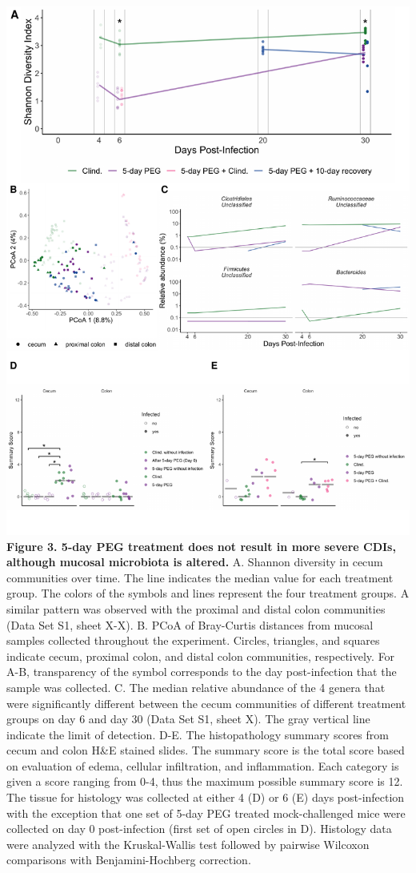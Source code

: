 \documentclass[
  11pt,
]{article}
\begin{document}
\includegraphics{figure_3.pdf} \textbf{Figure 3. 5-day PEG treatment
does not result in more severe CDIs, although mucosal microbiota is
altered.} A. Shannon diversity in cecum communities over time. The line
indicates the median value for each treatment group. The colors of the
symbols and lines represent the four treatment groups. A similar pattern
was observed with the proximal and distal colon communities (Data Set
S1, sheet X-X). B. PCoA of Bray-Curtis distances from mucosal samples
collected throughout the experiment. Circles, triangles, and squares
indicate cecum, proximal colon, and distal colon communities,
respectively. For A-B, transparency of the symbol corresponds to the day
post-infection that the sample was collected. C. The median relative
abundance of the 4 genera that were significantly different between the
cecum communities of different treatment groups on day 6 and day 30
(Data Set S1, sheet X). The gray vertical line indicate the limit of
detection. D-E. The histopathology summary scores from cecum and colon
H\&E stained slides. The summary score is the total score based on
evaluation of edema, cellular infiltration, and inflammation. Each
category is given a score ranging from 0-4, thus the maximum possible
summary score is 12. The tissue for histology was collected at either 4
(D) or 6 (E) days post-infection with the exception that one set of
5-day PEG treated mock-challenged mice were collected on day 0
post-infection (first set of open circles in D). Histology data were
analyzed with the Kruskal-Wallis test followed by pairwise Wilcoxon
comparisons with Benjamini-Hochberg correction. \newpage
\end{document}
